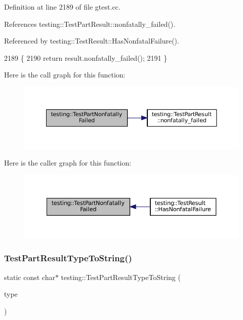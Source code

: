 Definition at line 2189 of file gtest.\+cc.



References testing\+::\+Test\+Part\+Result\+::nonfatally\+\_\+failed().



Referenced by testing\+::\+Test\+Result\+::\+Has\+Nonfatal\+Failure().


\begin{DoxyCode}
2189                                                                    \{
2190   \textcolor{keywordflow}{return} result.nonfatally\_failed();
2191 \}
\end{DoxyCode}
Here is the call graph for this function\+:
\nopagebreak
\begin{figure}[H]
\begin{center}
\leavevmode
\includegraphics[width=350pt]{namespacetesting_af256d104ca665115eb291f762bb659e3_cgraph}
\end{center}
\end{figure}
Here is the caller graph for this function\+:
\nopagebreak
\begin{figure}[H]
\begin{center}
\leavevmode
\includegraphics[width=350pt]{namespacetesting_af256d104ca665115eb291f762bb659e3_icgraph}
\end{center}
\end{figure}
\mbox{\label{namespacetesting_a4e9fdeef31f7e49afccfde0532f76864}} 
\subsubsection{\texorpdfstring{Test\+Part\+Result\+Type\+To\+String()}{TestPartResultTypeToString()}}
{\footnotesize\ttfamily static const char$\ast$ testing\+::\+Test\+Part\+Result\+Type\+To\+String (\begin{DoxyParamCaption}\item[{\hyperlink{classtesting_1_1TestPartResult_a65ae656b33fdfdfffaf34858778a52d5}{Test\+Part\+Result\+::\+Type}}]{type }\end{DoxyParamCaption})\hspace{0.3cm}{\ttfamily [static]}}



